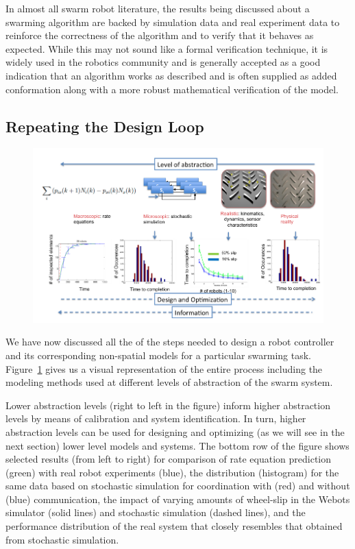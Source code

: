 \documentclass[Main.tex]{subfiles}
\begin{document}
In almost all swarm robot literature, the results being discussed about a swarming algorithm are backed by simulation data and real experiment data to reinforce the correctness of the algorithm and to verify that it behaves as expected. While this may not sound like a formal verification technique, it is widely used in the robotics community and is generally accepted as a good indication that an algorithm works as described and is often supplied as added conformation along with a more robust mathematical verification of the model.

\subsection{Repeating the Design Loop}
\begin{figure}[!ht]
\centering\includegraphics[width=15cm]{assets/modelLoop.png}
\centering\caption{}\label{fig:recipe}
\end{figure}

We have now discussed all the of the steps needed to design a robot controller and its corresponding non-spatial models for a particular swarming task. Figure~\ref{fig:recipe} gives us a visual representation of the entire process including the modeling methods used at different levels of abstraction of the swarm system. 

Lower abstraction levels (right to left in the figure) inform higher abstraction levels by means of calibration and system identification. In turn, higher abstraction levels can be used for designing and optimizing (as we will see in the next section) lower level models and systems. The bottom row of the figure shows selected results (from left to right) for  comparison of rate equation prediction (green) with real robot experiments (blue), the distribution (histogram) for the same data based on stochastic simulation for coordination with (red) and without (blue) communication, the impact of varying amounts of wheel-slip in the Webots simulator (solid lines) and stochastic simulation (dashed lines), and the performance distribution of the real system that closely resembles that obtained from stochastic simulation.
\end{document}
